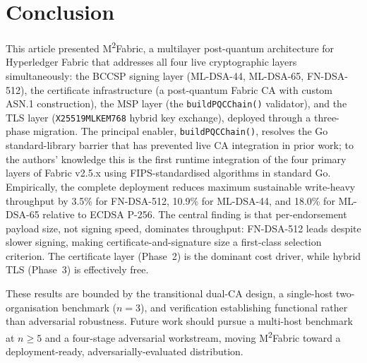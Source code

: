 \documentclass{ieeetj}
\newcommand{\mfabric}{M\textsuperscript{2}Fabric}
\begin{document}
\section{Conclusion} \label{sec:conclusion}
This article presented \mfabric{}, a multilayer post-quantum architecture for
Hyperledger Fabric that addresses all four live cryptographic layers
simultaneously: the BCCSP signing layer (ML-DSA-44, ML-DSA-65, FN-DSA-512), the
certificate infrastructure (a post-quantum Fabric CA with custom ASN.1
construction), the MSP layer (the \texttt{buildPQCChain()} validator), and the TLS
layer (\texttt{X25519MLKEM768} hybrid key exchange), deployed through a three-phase
migration. The principal enabler, \texttt{buildPQCChain()}, resolves the Go
standard-library barrier that has prevented live CA integration in prior work; to
the authors' knowledge this is the first runtime integration of the four primary
layers of Fabric v2.5.x using FIPS-standardised algorithms in standard Go.
Empirically, the complete deployment reduces maximum sustainable write-heavy
throughput by 3.5\% for FN-DSA-512, 10.9\% for ML-DSA-44, and 18.0\% for ML-DSA-65
relative to ECDSA P-256. The central finding is that per-endorsement payload size,
not signing speed, dominates throughput: FN-DSA-512 leads despite slower signing,
making certificate-and-signature size a first-class selection criterion. The
certificate layer (Phase~2) is the dominant cost driver, while hybrid TLS
(Phase~3) is effectively free.

These results are bounded by the transitional dual-CA design, a single-host
two-organisation benchmark ($n=3$), and verification establishing functional
rather than adversarial robustness. Future work should pursue a multi-host
benchmark at $n\ge5$ and a four-stage adversarial workstream, moving \mfabric{}
toward a deployment-ready, adversarially-evaluated distribution.




\vfill\pagebreak
\end{document}

